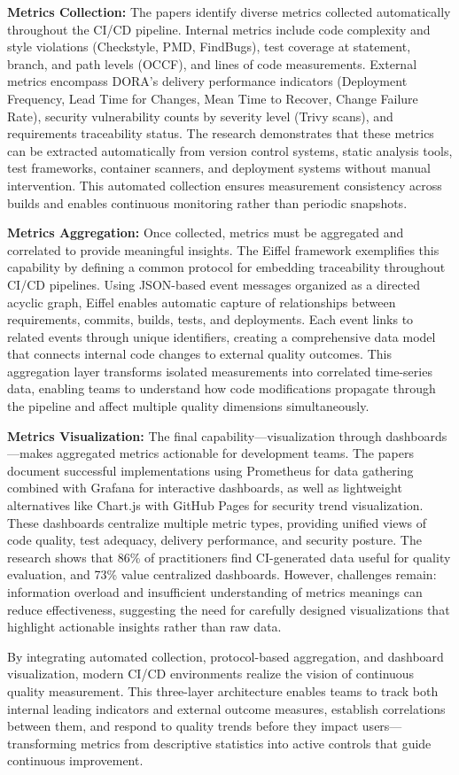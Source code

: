 \documentclass[12pt]{article}
\begin{document}
\textbf{Metrics Collection:} The papers identify diverse metrics
collected automatically throughout the CI/CD pipeline. Internal metrics
include code complexity and style violations (Checkstyle, PMD,
FindBugs), test coverage at statement, branch, and path levels (OCCF),
and lines of code measurements. External metrics encompass DORA's
delivery performance indicators (Deployment Frequency, Lead Time for
Changes, Mean Time to Recover, Change Failure Rate), security
vulnerability counts by severity level (Trivy scans), and requirements
traceability status. The research demonstrates that these metrics can
be extracted automatically from version control systems, static
analysis tools, test frameworks, container scanners, and deployment
systems without manual intervention. This automated collection ensures
measurement consistency across builds and enables continuous monitoring
rather than periodic snapshots.

\textbf{Metrics Aggregation:} Once collected, metrics must be
aggregated and correlated to provide meaningful insights. The Eiffel
framework exemplifies this capability by defining a common protocol for
embedding traceability throughout CI/CD pipelines. Using JSON-based
event messages organized as a directed acyclic graph, Eiffel enables
automatic capture of relationships between requirements, commits,
builds, tests, and deployments. Each event links to related events
through unique identifiers, creating a comprehensive data model that
connects internal code changes to external quality outcomes. This
aggregation layer transforms isolated measurements into correlated
time-series data, enabling teams to understand how code modifications
propagate through the pipeline and affect multiple quality dimensions
simultaneously.

\textbf{Metrics Visualization:} The final capability—visualization
through dashboards—makes aggregated metrics actionable for development
teams. The papers document successful implementations using Prometheus
for data gathering combined with Grafana for interactive dashboards, as
well as lightweight alternatives like Chart.js with GitHub Pages for
security trend visualization. These dashboards centralize multiple
metric types, providing unified views of code quality, test adequacy,
delivery performance, and security posture. The research shows that 86\%
of practitioners find CI-generated data useful for quality evaluation,
and 73\% value centralized dashboards. However, challenges remain:
information overload and insufficient understanding of metrics meanings
can reduce effectiveness, suggesting the need for carefully designed
visualizations that highlight actionable insights rather than raw data.

By integrating automated collection, protocol-based aggregation, and
dashboard visualization, modern CI/CD environments realize the vision
of continuous quality measurement. This three-layer architecture
enables teams to track both internal leading indicators and external
outcome measures, establish correlations between them, and respond to
quality trends before they impact users—transforming metrics from
descriptive statistics into active controls that guide continuous
improvement.



\end{document}
